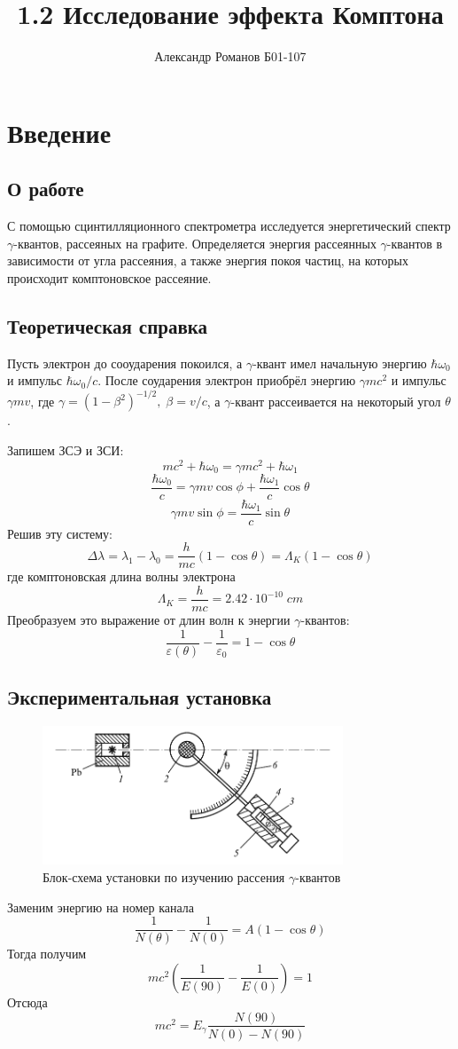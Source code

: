 \documentclass{article}
\author{Александр Романов Б01-107}
\date{}
\title{1.2 Исследование эффекта Комптона}
\begin{document}
\maketitle
\section{Введение}
\subsection{О работе}
С помощью сцинтилляционного спектрометра исследуется энергетический спектр \(\gamma\)-квантов, рассеяных на
графите. Определяется энергия рассеянных \(\gamma\)-квантов в зависимости от угла рассеяния, а также энергия
покоя частиц, на которых происходит комптоновское рассеяние.
\subsection{Теоретическая справка}
Пусть электрон до сооударения покоился, а \(\gamma\)-квант имел начальную энергию \(\hbar\omega_0\) и импульс
\(\hbar\omega_0/c\). После соударения электрон приобрёл энергию \(\gamma mc^2\) и импульс \(\gamma mv\), где
\(\gamma = (1-\beta^2)^{-1/2},\; \beta = v/c\), а \(\gamma\)-квант рассеивается на некоторый угол \(\theta\).

Запишем ЗСЭ и ЗСИ:
\[ mc^2 + \hbar\omega_0 = \gamma mc^2 + \hbar\omega_1 \]
\[ \frac{\hbar\omega_0}{c} = \gamma mv\cos{\phi} + \frac{\hbar\omega_1}{c}\cos{\theta} \]
\[ \gamma mv\sin{\phi} = \frac{\hbar\omega_1}{c}\sin{\theta} \]
Решив эту систему:
\[ \Delta\lambda = \lambda_1 - \lambda_0 = \frac{h}{mc}(1-\cos{\theta}) = \Lambda_K (1 - \cos{\theta})\]
где комптоновская длина волны электрона
\[ \Lambda_K = \frac{h}{mc} = 2.42\cdot 10^{-10}\; cm \]
Преобразуем это выражение от длин волн к энергии \(\gamma\)-квантов:
\[ \frac{1}{\varepsilon\left(\theta\right)} - \frac{1}{\varepsilon_0} = 1 - \cos{\theta} \]

\subsection{Экспериментальная установка}
\begin{figure}[H]
  \centering
  \includegraphics[width=0.8\textwidth]{scheme.png}
	\caption{Блок-схема установки по изучению рассения \(\gamma\)-квантов}
\end{figure}
Заменим энергию на номер канала
\[ \frac{1}{N\left(\theta\right)} - \frac{1}{N\left(0\right)} = A(1-\cos{\theta}) \]
Тогда получим
\[mc^2\left(\frac{1}{E(90)} - \frac{1}{E(0)}\right) = 1\]
Отсюда
\begin{equation}
	mc^2 = E_{\gamma}\frac{N(90)}{N(0) - N(90)} \label{eq:calm}
\end{equation}
\end{document}
